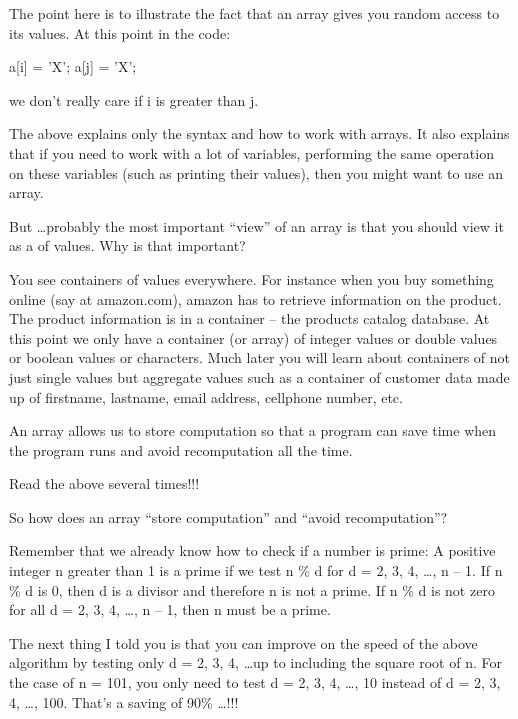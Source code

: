 The point here is to illustrate the fact that an array gives you random access to its values. At this point in the code:

\begin{consolethree}[escapeinside=||]
a[i] = 'X';
a[j] = 'X'; 
\end{consolethree}

we don't really care if i is greater than j.


\newpage{}

The above explains only the syntax and how to work with arrays. It also explains that if you need to work with a lot of variables, performing the same operation on these variables (such as printing their values), then you might want to use an array.

But \ldots probably the most important ``view'' of an array is that you should view it as a  of values. Why is that important?

You see containers of values everywhere. For instance when you buy something online (say at amazon.com), amazon has to retrieve information on the product. The product information is in a container -- the products catalog database. At this point we only have a container (or array) of integer values or double values or boolean values or characters. Much later you will learn about containers of not just single values but aggregate values such as a container of customer data made up of firstname, lastname, email address, cellphone number, etc.

An array allows us to store computation so that a program can save time when the program runs and avoid recomputation all the time.

Read the above several times!!!

So how does an array ``store computation'' and ``avoid recomputation''?

Remember that we already know how to check if a number is prime: A positive integer n greater than 1 is a prime if we test n \% d for d = 2, 3, 4, \ldots, n -- 1. If n \% d is 0, then d is a divisor and therefore n is not a prime. If n \% d is not zero for all d = 2, 3, 4, \ldots, n -- 1, then n must be a prime.

The next thing I told you is that you can improve on the speed of the above algorithm by testing only d = 2, 3, 4, \ldots up to including the square root of n. For the case of n = 101, you only need to test d = 2, 3, 4, \ldots, 10 instead of d = 2, 3, 4, \ldots, 100. That's a saving of 90\% \ldots !!!

